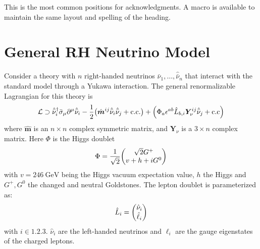 \documentclass[a4paper,11pt]{article} \pdfoutput=1
\newcommand{\rhn}{\bar{\nu}}
\begin{document}
\acknowledgments

This is the most common positions for acknowledgments. A macro is
available to maintain the same layout and spelling of the heading.


\appendix

\section{General RH Neutrino Model}

Consider a theory with \(n\) right-handed neutrinos \(\hat{\rhn}_1, \dots, \hat{\rhn}_n\) that
interact with the standard model through a Yukawa interaction. The general
renormalizable Lagrangian for this theory is
\begin{align}\label{eqn:GeneralRHN}
	\mathcal{L}\supset
	\hat{\rhn}_i^{\dagger}\bar{\sigma}_{\mu}\partial^{\mu}\hat{\rhn}_i
	-\frac{1}{2}\qty(\hat{\bm{m}}^{ij}\hat{\rhn}_i\hat{\rhn}_j + \mathrm{c.c.})
	+ \qty(\Phi_{a}\epsilon^{ab}\hat{L}_{b,i}\bm{Y}^{ij}_{\nu}\hat{\rhn}_{j} + \mathrm{c.c})
\end{align}
where \(\hat{\bm{m}}\) is an \(n\times n\) complex symmetric matrix, and
\(\bm{Y}_{\nu}\) is a \(3\times n\) complex matrix. Here \(\Phi\) is the Higgs doublet
\begin{align}
	\Phi = \frac{1}{\sqrt{2}}\mqty(\sqrt{2}G^{+} \\ v + h + iG^{0})
\end{align}
with \(v = 246 \ \mathrm{GeV}\) being the Higgs vacuum expectation value, \(h\)
the Higgs and \(G^{+},G^{0}\) the changed and neutral Goldstones. The lepton
doublet is parameterized as:
\begin{align}
	\hat{L}_{i} = \mqty(\hat{\nu}_i \\ \hat{\ell}_i)
\end{align}
with \(i\in\qty{1,2,3}\). \(\hat{\nu}_i\) are the left-handed neutrinos and
\(\ell_i\) are the gauge eigenstates of the charged leptons.
\end{document}
